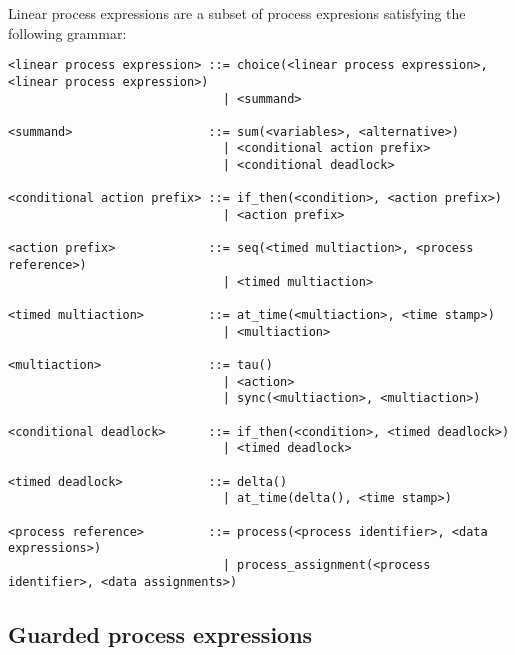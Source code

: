\documentclass{article}
\begin{document}
Linear process expressions are a subset of process expresions satisfying the
following grammar:
\begin{verbatim}
<linear process expression> ::= choice(<linear process expression>, <linear process expression>)
                              | <summand>
 
<summand>                   ::= sum(<variables>, <alternative>)
                              | <conditional action prefix>
                              | <conditional deadlock>
 
<conditional action prefix> ::= if_then(<condition>, <action prefix>)
                              | <action prefix>
 
<action prefix>             ::= seq(<timed multiaction>, <process reference>)
                              | <timed multiaction>
 
<timed multiaction>         ::= at_time(<multiaction>, <time stamp>)
                              | <multiaction>
 
<multiaction>               ::= tau()
                              | <action>
                              | sync(<multiaction>, <multiaction>)
 
<conditional deadlock>      ::= if_then(<condition>, <timed deadlock>)
                              | <timed deadlock>
 
<timed deadlock>            ::= delta()
                              | at_time(delta(), <time stamp>)
 
<process reference>         ::= process(<process identifier>, <data expressions>)
                              | process_assignment(<process identifier>, <data assignments>)
\end{verbatim}

\newpage

\subsection{Guarded process expressions}
\end{document}
